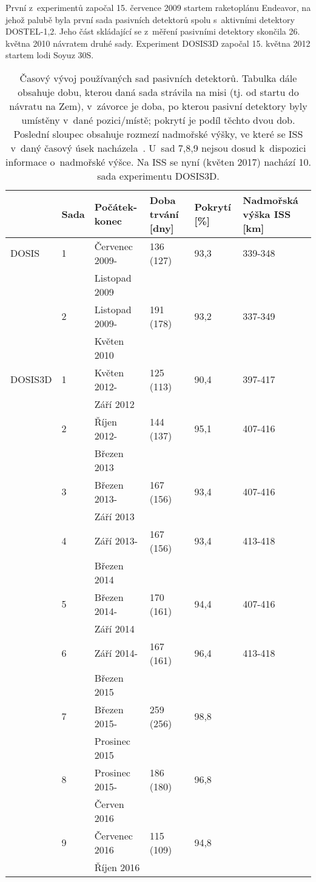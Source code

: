 První z~experimentů započal 15. července 2009 startem raketoplánu Endeavor, na jehož palubě byla
první sada pasivních detektorů spolu s~aktivními detektory \mbox{DOSTEL-1,2}. Jeho část skládající se z~měření pasivními detektory skončila 26. května 2010 návratem druhé sady. Experiment DOSIS3D započal 15. května 2012 startem lodi Soyuz 30S. 
\begin{table}[ht]
  \centering
\footnotesize
  \caption{Časový vývoj používaných sad pasivních detektorů. Tabulka dále obsahuje dobu, kterou daná sada strávila na misi (tj. od startu do návratu na Zem), v~závorce je doba, po kterou pasivní detektory byly umístěny v~dané pozici/místě; pokrytí je podíl těchto dvou dob. Poslední sloupec obsahuje rozmezí nadmořské výšky, ve které se ISS v~daný časový úsek nacházela~\cite{dosis}. U~sad 7,8,9 nejsou dosud k~dispozici informace o~nadmořské výšce. Na ISS se nyní (květen 2017) nachází 10. sada experimentu DOSIS3D.}
  \label{tab:dosis_timeline_passive}
  \begin{tabularx}{\textwidth}{llllll}
	\toprule
	&Sada&	Počátek-konec	&Doba trvání [dny]	&Pokrytí [\%]	&Nadmořská výška ISS [km]\\
	\midrule
DOSIS	&1	&Červenec 2009-	&136 (127)	&93,3	&339-348\\
		&	&Listopad 2009	&		    &       &       \\
		&2	&Listopad 2009-	&191 (178)	&93,2	&337-349\\
		&	&Květen 2010	&		    &       &       \\
DOSIS3D	&1	&Květen 2012-	&125 (113)	&90,4	&397-417\\
		&	&Září 2012		&	        &       &       \\
		&2	&Říjen 2012-	&144 (137)	&95,1	&407-416\\
		&	&Březen 2013	&		    &       &       \\
		&3	&Březen 2013-	&167 (156)	&93,4	&407-416\\
		&	&Září 2013		&	        &       &       \\
		&4	&Září 2013-		&167 (156)	&93,4	&413-418\\
		&	&Březen 2014	&		    &       &       \\
		&5	&Březen 2014-	&170 (161)	&94,4	&407-416\\
		&	&Září 2014		&	        &       &       \\
		&6	&Září 2014-		&167 (161)	&96,4	&413-418\\
		&	&Březen 2015	&			&		&		\\
		&7	&Březen 2015-	&259 (256)	&98,8	&		\\
		&	&Prosinec 2015	&			&		&		\\
		&8	&Prosinec 2015- &186 (180)	&96,8	&		\\
		&	&Červen 2016	&			&		&		\\
		&9	&Červenec 2016	&115 (109)	&94,8	&		\\
		&	&Říjen 2016		&			&		&		\\
		\bottomrule
  \end{tabularx}
\end{table}
